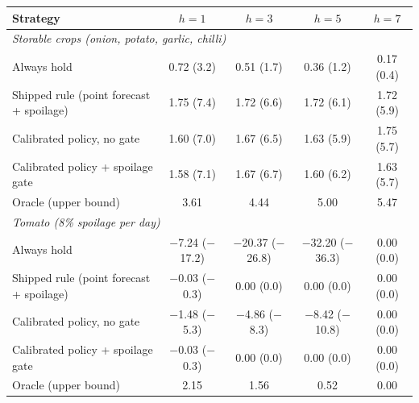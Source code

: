 \begin{tabular}{lcccc}
\toprule
Strategy & $h{=}1$ & $h{=}3$ & $h{=}5$ & $h{=}7$\\
\midrule
\multicolumn{5}{l}{\emph{Storable crops (onion, potato, garlic, chilli)}}\\
Always hold & 0.72 (3.2) & 0.51 (1.7) & 0.36 (1.2) & 0.17 (0.4)\\
Shipped rule (point forecast + spoilage) & 1.75 (7.4) & 1.72 (6.6) & 1.72 (6.1) & 1.72 (5.9)\\
Calibrated policy, no gate & 1.60 (7.0) & 1.67 (6.5) & 1.63 (5.9) & 1.75 (5.7)\\
Calibrated policy + spoilage gate & 1.58 (7.1) & 1.67 (6.7) & 1.60 (6.2) & 1.63 (5.7)\\
Oracle (upper bound) & 3.61 & 4.44 & 5.00 & 5.47\\
\midrule
\multicolumn{5}{l}{\emph{Tomato (8\% spoilage per day)}}\\
Always hold & $-$7.24 ($-$17.2) & $-$20.37 ($-$26.8) & $-$32.20 ($-$36.3) & 0.00 (0.0)\\
Shipped rule (point forecast + spoilage) & $-$0.03 ($-$0.3) & 0.00 (0.0) & 0.00 (0.0) & 0.00 (0.0)\\
Calibrated policy, no gate & $-$1.48 ($-$5.3) & $-$4.86 ($-$8.3) & $-$8.42 ($-$10.8) & 0.00 (0.0)\\
Calibrated policy + spoilage gate & $-$0.03 ($-$0.3) & 0.00 (0.0) & 0.00 (0.0) & 0.00 (0.0)\\
Oracle (upper bound) & 2.15 & 1.56 & 0.52 & 0.00\\
\bottomrule
\end{tabular}
